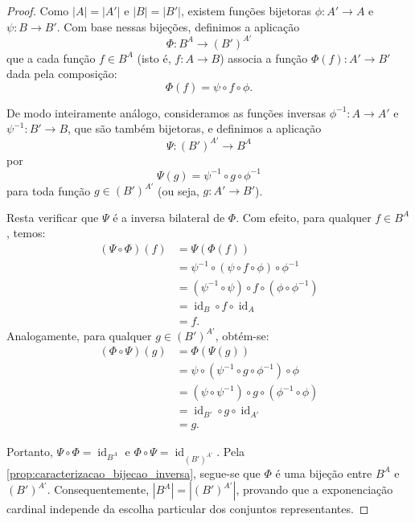 \begin{proof}
    Como \(|A| = |A'|\) e \(|B| = |B'|\), existem funções bijetoras \(\phi: A' \to A\) e \(\psi: B \to B'\). Com base nessas bijeções, definimos a aplicação
    \[
        \Phi: B^A \to (B')^{A'}
    \]
    que a cada função \(f \in B^A\) (isto é, \(f: A \to B\)) associa a função \(\Phi(f): A' \to B'\) dada pela composição:
    \[
        \Phi(f) = \psi \circ f \circ \phi.
    \]

    De modo inteiramente análogo, consideramos as funções inversas \(\phi^{-1}: A \to A'\) e \(\psi^{-1}: B' \to B\), que são também bijetoras, e definimos a aplicação
    \[
        \Psi: (B')^{A'} \to B^A
    \]
    por
    \[
        \Psi(g) = \psi^{-1} \circ g \circ \phi^{-1}
    \]
    para toda função \(g \in (B')^{A'}\) (ou seja, \(g: A' \to B'\)).

    Resta verificar que \(\Psi\) é a inversa bilateral de \(\Phi\). Com efeito, para qualquer \(f \in B^A\), temos:
    \begin{align*}
        (\Psi \circ \Phi)(f) & = \Psi(\Phi(f))                                               \\
                             & = \psi^{-1} \circ (\psi \circ f \circ \phi) \circ \phi^{-1}   \\
                             & = (\psi^{-1} \circ \psi) \circ f \circ (\phi \circ \phi^{-1}) \\
                             & = \operatorname{id}_B \circ f \circ \operatorname{id}_A       \\
                             & = f.
    \end{align*}
    Analogamente, para qualquer \(g \in (B')^{A'}\), obtém-se:
    \begin{align*}
        (\Phi \circ \Psi)(g) & = \Phi(\Psi(g))                                               \\
                             & = \psi \circ (\psi^{-1} \circ g \circ \phi^{-1}) \circ \phi   \\
                             & = (\psi \circ \psi^{-1}) \circ g \circ (\phi^{-1} \circ \phi) \\
                             & = \operatorname{id}_{B'} \circ g \circ \operatorname{id}_{A'} \\
                             & = g.
    \end{align*}

    Portanto, \(\Psi \circ \Phi = \operatorname{id}_{B^A}\) e \(\Phi \circ \Psi = \operatorname{id}_{(B')^{A'}}\). Pela \autoref{prop:caracterizacao_bijecao_inversa}, segue-se que \(\Phi\) é uma bijeção entre \(B^A\) e \((B')^{A'}\). Consequentemente, \(|B^A| = |(B')^{A'}|\), provando que a exponenciação cardinal independe da escolha particular dos conjuntos representantes.
\end{proof}

